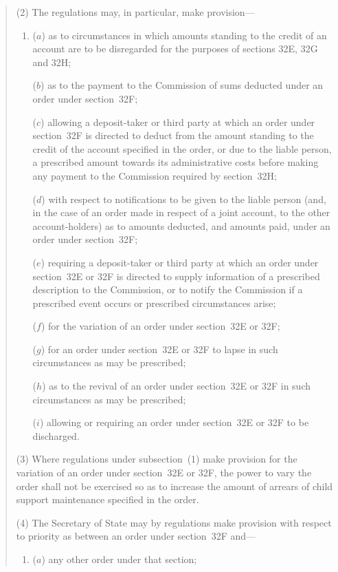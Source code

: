 \documentclass[12pt,a4paper]{article}
\begin{document}
\begin{quotation}
(2) The regulations may, in particular, make provision---
\begin{enumerate}\item[]
($a$) as to circumstances in which amounts standing to the credit of an account are to be disregarded for the purposes of sections 32E, 32G and 32H;

($b$) as to the payment to the Commission of sums deducted under an order under section~32F;

($c$) allowing a deposit-taker or third party at which an order under section~32F is directed to deduct from the amount standing to the credit of the account specified in the order, or due to the liable person, a prescribed amount towards its administrative costs before making any payment to the Commission required by section~32H;

($d$) with respect to notifications to be given to the liable person (and, in the case of an order made in respect of a joint account, to the other account-holders) as to amounts deducted, and amounts paid, under an order under section~32F;

($e$) requiring a deposit-taker or third party at which an order under section~32E or 32F is directed to supply information of a prescribed description to the Commission, or to notify the Commission if a prescribed event occurs or prescribed circumstances arise;

($f$) for the variation of an order under section~32E or 32F;

($g$) for an order under section~32E or 32F to lapse in such circumstances as may be prescribed;

($h$) as to the revival of an order under section~32E or 32F in such circumstances as may be prescribed;

($i$) allowing or requiring an order under section~32E or 32F to be discharged.
\end{enumerate}

(3)
Where regulations under subsection~(1) make provision for the variation of an order under section~32E or 32F, the power to vary the order shall not be exercised so as to increase the amount of arrears of child support maintenance specified in the order.

(4)
The Secretary of State may by regulations make provision with respect to priority as between an order under section~32F and---
\begin{enumerate}\item[]
($a$) any other order under that section;


\end{enumerate}
\end{quotation}
\end{document}
